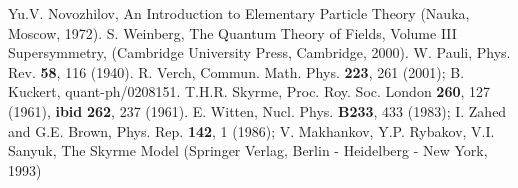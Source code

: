 \documentclass[a4paper,12pt]{article}%
\begin{document}
\begin{thebibliography}{99}
 Yu.V. Novozhilov, 
An Introduction to Elementary Particle
Theory (Nauka, Moscow, 1972).
 S. Weinberg, The Quantum 
Theory of Fields, Volume III Supersymmetry, (Cambridge 
University Press, Cambridge, 2000).
 W. Pauli, Phys. Rev. {\bf 58}, 116 (1940).
 R. Verch, Commun. Math. Phys. {\bf 223},
261 (2001); B. Kuckert, quant-ph/0208151.
 T.H.R. Skyrme, Proc. Roy. Soc. London
{\bf 260}, 127 (1961), {\bf ibid} {\bf 262}, 237 (1961).
 E. Witten, Nucl. Phys. {\bf B233}, 433 (1983);
I. Zahed and G.E. Brown, Phys. Rep. {\bf 142}, 1 (1986);
V. Makhankov, Y.P. Rybakov, V.I. Sanyuk, The Skyrme Model
(Springer Verlag, Berlin - Heidelberg - New York, 1993)
\end{thebibliography}
\end{document}

